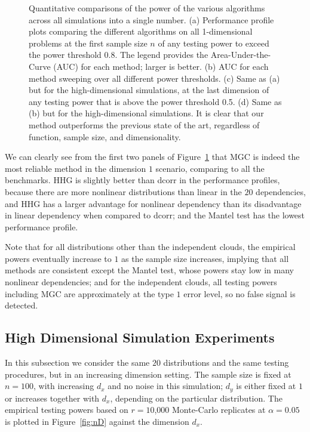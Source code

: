 \documentclass[11pt]{article}
\newcommand{\jv}[1]{{\color{red}{#1}}}
\begin{document}
\begin{figure}[htbp]
{}
\caption{Quantitative comparisons of the power of the various algorithms across all simulations into a single number.  
(a) Performance profile plots comparing the different algorithms on all 1-dimensional problems at the first sample size $n$ of any testing power to exceed the power threshold 0.8. The legend provides the Area-Under-the-Curve (AUC) for each method; larger is better.
(b) AUC for each method sweeping over all different power thresholds.
(c) Same as (a) but for the high-dimensional simulations, at the last dimension of any testing power that is above the power threshold 0.5.
(d) Same as (b) but for the high-dimensional simulations.
It is clear that our method outperforms the previous state of the art, regardless of function, sample size, and dimensionality.}
\label{fig:pp}
\end{figure}

\jv{replace all mentions of ``panel'' by naming subfigs (A) thru (D), i find it better to put the names in the titles, rather than have latex do it in the bottom.}

We can clearly see from the first two panels of Figure~\ref{fig:pp} that MGC is indeed the most reliable method in the dimension $1$ scenario, comparing to all the benchmarks. HHG is slightly better than dcorr in the performance profiles, because there are more nonlinear distributions than linear in the $20$ dependencies, and HHG has a larger advantage for nonlinear dependency than its disadvantage in linear dependency when compared to dcorr; and the Mantel test has the lowest performance profile. 

Note that for all distributions other than the independent clouds, the empirical powers eventually increase to $1$ as the sample size increases, implying that all methods are consistent except the Mantel test, whose powers stay low in many nonlinear dependencies; and for the independent clouds, all testing powers including MGC are approximately at the type $1$ error level, so no false signal is detected. %



\subsection{High Dimensional Simulation Experiments}
\label{numer2}
In this subsection we consider the same $20$ distributions and the same testing procedures, but in an increasing dimension setting. The sample size is fixed at $n=100$, with increasing $d_{x}$ and no noise in this simulation; $d_{y}$ is either fixed at $1$ or increases together with $d_{x}$, depending on the particular distribution. The empirical testing powers based on $r=10$,$000$ Monte-Carlo replicates at $\alpha=0.05$ is plotted in Figure~\ref{fig:nD} against the dimension $d_{x}$.
\end{document}
